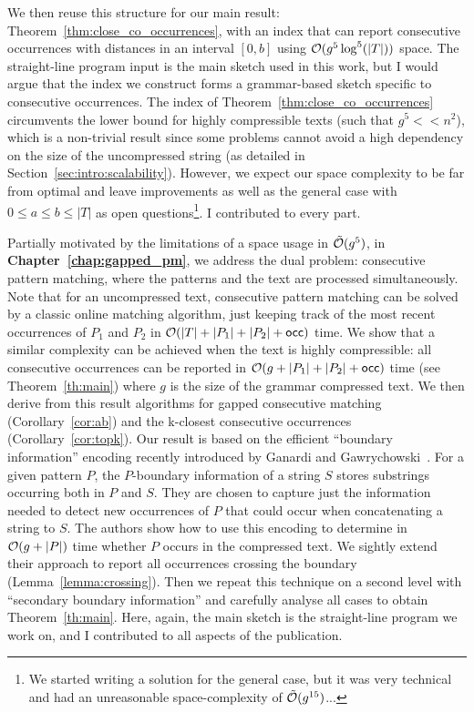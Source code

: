 We then reuse this structure for our main result: Theorem~\ref{thm:close_co_occurrences}, with an index that can report consecutive occurrences with distances in an interval $[0,b]$ using $\mathcal{O} (g^5\log^5(|T|))$ space.
The straight-line program input is the main sketch used in this work, but I would argue that the index we construct forms a grammar-based sketch specific to consecutive occurrences.
The index of Theorem~\ref{thm:close_co_occurrences} circumvents the lower bound for highly compressible texts (such that $g^5 << n^2$), which is a non-trivial result since some problems cannot avoid a high dependency on the size of the uncompressed string (as detailed in Section~\ref{sec:intro:scalability}). However, we expect our space complexity to be far from optimal and leave improvements as well as the general case with $0 \leq a \leq b \leq |T|$ as open questions\footnote{We started writing a solution for the general case, but it was very technical and had an unreasonable space-complexity of $\tilde {\mathcal{O}}(g^{15})$...}. I contributed to every part.


Partially motivated by the limitations of a space usage in $\tilde {\mathcal{O}}(g^5)$, in \textbf{Chapter~\ref{chap:gapped_pm}}, we address the dual problem: consecutive pattern matching, where the patterns and the text are processed simultaneously. Note that for an uncompressed text, consecutive pattern matching can be solved by a classic online matching algorithm, just keeping track of the most recent occurrences of $P_1$ and $P_2$ in $\mathcal{O}(|T|+|P_1|+|P_2|+\mathsf{occ})$ time.
We show that a similar complexity can be achieved when the text is highly compressible: all consecutive occurrences can be reported in $\mathcal{O}(g+|P_1|+|P_2|+\mathsf{occ})$ time (see Theorem~\ref{th:main}) where $g$ is the size of the grammar compressed text. We then derive from this result algorithms for gapped consecutive matching (Corollary~\ref{cor:ab}) and the k-closest consecutive occurrences (Corollary~\ref{cor:topk}).
Our result is based on the efficient ``boundary information'' encoding recently introduced by Ganardi and Gawrychowski~\cite{DBLP:conf/soda/GanardiG22}. For a given pattern $P$, the $P$-boundary information of a string $S$ stores substrings occurring both in $P$ and $S$. They are chosen to capture just the information needed to detect new occurrences of $P$ that could occur when concatenating a string to $S$.
The authors show how to use this encoding to determine in $\mathcal{O}(g+|P|)$ time whether $P$ occurs in the compressed text. We sightly extend their approach to report all occurrences crossing the boundary (Lemma~\ref{lemma:crossing}). Then we repeat this technique on a second level with ``secondary boundary information'' and carefully analyse all cases to obtain Theorem~\ref{th:main}. Here, again, the main sketch is the straight-line program we work on, and I contributed to all aspects of the publication.


